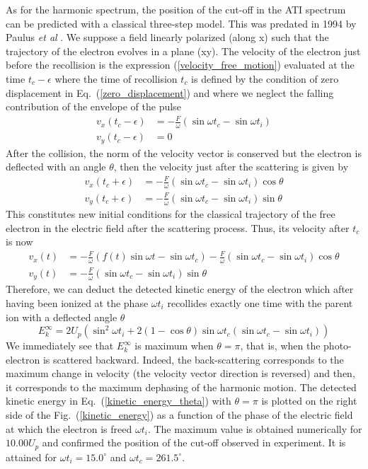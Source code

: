 \documentclass[a4paper]{article}
\begin{document}
As for the harmonic spectrum, the position of the cut-off in the ATI spectrum can be predicted with a classical three-step model. This was predated in 1994 by Paulus \textit{et al} \cite{Paulus_1994_Classical_Model}. We suppose a field linearly polarized (along x) such that the trajectory of the electron evolves in a plane (xy). The velocity of the electron just before the recollision is the expression (\ref{velocity_free_motion}) evaluated at the time $t_{c}-\epsilon$ where the time of recollision $t_{c}$ is defined by the condition of zero displacement in Eq.~(\ref{zero_displacement}) and where we neglect the falling contribution of the envelope of the pulse
\begin{align}
v_{x}(t_{c}-\epsilon)&=-\frac{F}{\omega} \left( \sin{\omega t_{c}} - \sin{\omega t_{i}} \right) \\
v_{y}(t_{c}-\epsilon)&=0
\end{align}
After the collision, the norm of the velocity vector is conserved but the electron is deflected with an angle $\theta$, then the velocity just after the scattering is given by
\begin{align}
v_{x}(t_{c}+\epsilon)&=-\frac{F}{\omega} \left( \sin{\omega t_{c}} - \sin{\omega t_{i}} \right) \cos{\theta} \\
v_{y}(t_{c}+\epsilon)&=-\frac{F}{\omega} \left( \sin{\omega t_{c}} - \sin{\omega t_{i}} \right) \sin{\theta}
\end{align}
This constitutes new initial conditions for the classical trajectory of the free electron in the electric field after the scattering process. Thus, its velocity after $t_{c}$ is now
\begin{align}
v_{x}(t)&=-\frac{F}{\omega} \left(f(t)\sin{\omega t}-\sin{\omega t_{c}} \right) - \frac{F}{\omega} \left( \sin{\omega t_{c}}-\sin{\omega t_{i}} \right) \cos{\theta} \\
v_{y}(t)&=-\frac{F}{\omega} \left( \sin{\omega t_{c}} - \sin{\omega t_{i}} \right) \sin{\theta}
\end{align}
Therefore, we can deduct the detected kinetic energy of the electron which after having been ionized at the phase $\omega t_{i}$ recollides exactly one time with the parent ion with a deflected angle $\theta$
\begin{equation}
E_{k}^{\infty}=2 U_{p} \left(\sin^{2}{\omega t_{i}}+2(1-\cos{\theta})\sin{\omega t_{c}} \left(\sin{\omega t_{c}}-\sin{\omega t_{i}}\right)\right)
\label{kinetic_energy_theta}
\end{equation}
We immediately see that $E_{k}^{\infty}$ is maximum when $\theta=\pi$, that is, when the photo-electron is scattered backward. Indeed, the back-scattering corresponds to the maximum change in velocity (the velocity vector direction is reversed) and then, it corresponds to the maximum dephasing of the harmonic motion. The detected kinetic energy in Eq.~(\ref{kinetic_energy_theta}) with $\theta=\pi$ is plotted on the right side of the Fig.~(\ref{kinetic_energy}) as a function of the phase of the electric field at which the electron is freed $\omega t_{i}$.
The maximum value is obtained numerically for $10.00 U_{p}$ and confirmed the position of the cut-off observed in experiment. It is attained for $\omega t_{i}=15.0^{\circ}$ and $\omega t_{c}=261.5^{\circ}$.
\end{document}
